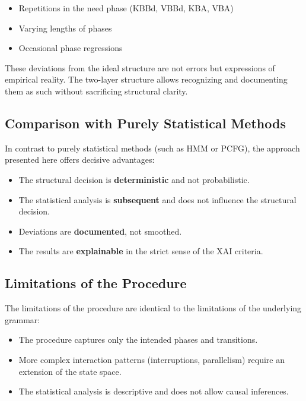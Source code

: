 \documentclass[
  12pt,
  a4paper,
  oneside,
  titlepage
]{article}
\begin{document}
\begin{itemize}
    \item Repetitions in the need phase (KBBd, VBBd, KBA, VBA)
    \item Varying lengths of phases
    \item Occasional phase regressions
\end{itemize}

These deviations from the ideal structure are not errors but expressions of 
empirical reality. The two-layer structure allows recognizing and documenting 
them as such without sacrificing structural clarity.

\subsection{Comparison with Purely Statistical Methods}

In contrast to purely statistical methods (such as HMM or PCFG), the approach 
presented here offers decisive advantages:

\begin{itemize}
    \item The structural decision is \textbf{deterministic} and not probabilistic.
    
    \item The statistical analysis is \textbf{subsequent} and does not influence 
    the structural decision.
    
    \item Deviations are \textbf{documented}, not smoothed.
    
    \item The results are \textbf{explainable} in the strict sense of the XAI 
    criteria.
\end{itemize}

\subsection{Limitations of the Procedure}

The limitations of the procedure are identical to the limitations of the 
underlying grammar:

\begin{itemize}
    \item The procedure captures only the intended phases and transitions.
    
    \item More complex interaction patterns (interruptions, parallelism) require 
    an extension of the state space.
    
    \item The statistical analysis is descriptive and does not allow causal 
    inferences.
\end{itemize}
\end{document}
